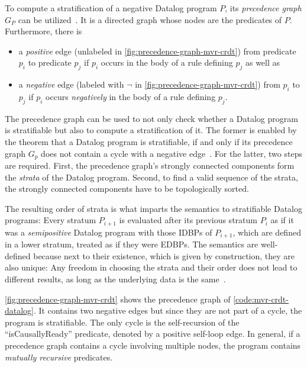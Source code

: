 To compute a stratification of a negative Datalog program \(P\),
its \emph{precedence graph} \(G_P\) can be utilized~\cite{green2013datalog}.
It is a directed graph whose nodes are the predicates of \(P\).
Furthermore, there is

\begin{itemize}
	\item a \emph{positive} edge
	      (unlabeled in \ref{fig:precedence-graph-mvr-crdt})
	      from predicate \(p_i\) to predicate \(p_j\)
	      if \(p_i\) occurs in the body of a rule defining \(p_j\) as well as
	\item a \emph{negative} edge
	      (labeled with \(\lnot\) in \ref{fig:precedence-graph-mvr-crdt})
	      from \(p_i\) to \(p_j\)
	      if \(p_i\) occurs \emph{negatively} in the body of a rule defining \(p_j\).
\end{itemize}

The precedence graph can be used to not only check whether a Datalog
program is stratifiable but also to compute a stratification of it.
The former is enabled by the theorem that a Datalog program is stratifiable,
if and only if its precedence graph \(G_p\) does not contain a cycle
with a negative edge~\cite{green2013datalog}.
For the latter, two steps are required.
First, the precedence graph's strongly connected components form the
\emph{strata} of the Datalog program.
Second, to find a valid sequence of the strata,
the strongly connected components have to be topologically sorted.

The resulting order of strata is what imparts the semantics to stratifiable
Datalog programs:
Every stratum \(P_{i+1}\) is evaluated after its previous stratum \(P_{i}\)
as if it was a \emph{semipositive} Datalog program with those \acp{IDBP}
of \(P_{i+1}\), which are defined in a lower stratum,
treated as if they were \acp{EDBP}.
The semantics are well-defined because next to their existence,
which is given by construction, they are also unique: Any freedom
in choosing the strata and their order does not lead to different results,
as long as the underlying data is the same~\cite{apt1988towards}.

\ref{fig:precedence-graph-mvr-crdt} shows the precedence graph
of \ref{code:mvr-crdt-datalog}.
It contains two negative edges but since they are not part of a cycle,
the program is stratifiable.
The only cycle is the self-recursion of the ``isCausallyReady'' predicate,
denoted by a positive self-loop edge.
In general, if a precedence graph contains a cycle involving multiple nodes,
the program contains \emph{mutually recursive} predicates.

